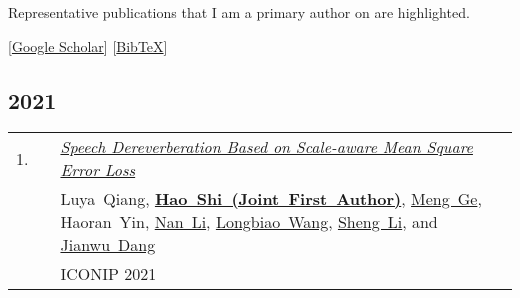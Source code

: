 \documentclass[11pt,letter,sans]{moderncv}
\begin{document}
Representative publications that I am a primary author on are
\colorbox{tab_highlight}{highlighted.}

[\href{https://scholar.google.com/citations?user=DclFbLwAAAAJ&hl}{Google Scholar}]
[\href{https://github.com/bamos/cv/blob/master/publications/all.bib}{BibTeX}]




\subsection{2021}

\begin{minipage}{\textwidth}
\begin{tabular}{R{8mm}p{1mm}L{6.5in}}
 1.\hspace*{1mm} && \textit{\href{https://hshi-speech.github.io/resume/pdf/SaSD.pdf}{Speech Dereverberation Based on Scale-aware Mean Square Error Loss} }  \\
 && \mbox{Luya Qiang}, \mbox{\textbf{\href{https://scholar.google.com/citations?user=DclFbLwAAAAJ}{Hao Shi (Joint First Author)}}}, \mbox{\href{https://scholar.google.com/citations?user=Ody4GF0AAAAJ}{Meng Ge}}, \mbox{Haoran Yin}, \mbox{\href{https://scholar.google.com/citations?user=9BVJbdsAAAAJ}{Nan Li}}, \mbox{\href{https://scholar.google.com/citations?user=1Z9_5ZgAAAAJ}{Longbiao Wang}}, \mbox{\href{https://scholar.google.com/citations?user=zHAhs0IAAAAJ}{Sheng Li}}, and \mbox{\href{https://scholar.google.com/citations?user=Wk5ApskAAAAJ}{Jianwu Dang}} \\
 && ICONIP 2021  \\
\end{tabular} \\[2mm]
\end{minipage}
\end{document}
